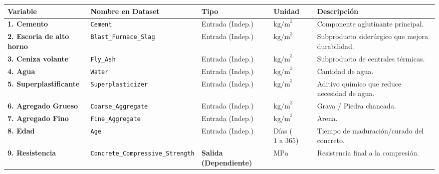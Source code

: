 \documentclass[
]{book}
\newcounter{none} %
\begin{document}
{\def\LTcaptype{none} %
\begin{longtable}[]{@{}
  >{\raggedright\arraybackslash}p{}
  >{\raggedright\arraybackslash}p{}
  >{\raggedright\arraybackslash}p{}
  >{\raggedright\arraybackslash}p{}
  >{\raggedright\arraybackslash}p{}@{}}
\toprule\noalign{}
\begin{minipage}[b]{\linewidth}\raggedright
Variable
\end{minipage} & \begin{minipage}[b]{\linewidth}\raggedright
Nombre en Dataset
\end{minipage} & \begin{minipage}[b]{\linewidth}\raggedright
Tipo
\end{minipage} & \begin{minipage}[b]{\linewidth}\raggedright
Unidad
\end{minipage} & \begin{minipage}[b]{\linewidth}\raggedright
Descripción
\end{minipage} \\
\midrule\noalign{}
\endhead
\bottomrule\noalign{}
\endlastfoot
\textbf{1. Cemento} & \texttt{Cement} & Entrada (Indep.) & \(\text{kg/m}^3\) & Componente aglutinante principal. \\
\textbf{2. Escoria de alto horno} & \texttt{Blast\_Furnace\_Slag} & Entrada (Indep.) & \(\text{kg/m}^3\) & Subproducto siderúrgico que mejora durabilidad. \\
\textbf{3. Ceniza volante} & \texttt{Fly\_Ash} & Entrada (Indep.) & \(\text{kg/m}^3\) & Subproducto de centrales térmicas. \\
\textbf{4. Agua} & \texttt{Water} & Entrada (Indep.) & \(\text{kg/m}^3\) & Cantidad de agua. \\
\textbf{5. Superplastificante} & \texttt{Superplasticizer} & Entrada (Indep.) & \(\text{kg/m}^3\) & Aditivo químico que reduce necesidad de agua. \\
\textbf{6. Agregado Grueso} & \texttt{Coarse\_Aggregate} & Entrada (Indep.) & \(\text{kg/m}^3\) & Grava / Piedra chancada. \\
\textbf{7. Agregado Fino} & \texttt{Fine\_Aggregate} & Entrada (Indep.) & \(\text{kg/m}^3\) & Arena. \\
\textbf{8. Edad} & \texttt{Age} & Entrada (Indep.) & Días (\(1 \text{ a } 365\)) & Tiempo de maduración/curado del concreto. \\
\textbf{9. Resistencia} & \texttt{Concrete\_Compressive\_Strength} & \textbf{Salida (Dependiente)} & \(\text{MPa}\) & Resistencia final a la compresión. \\
\end{longtable}
}
\end{document}
